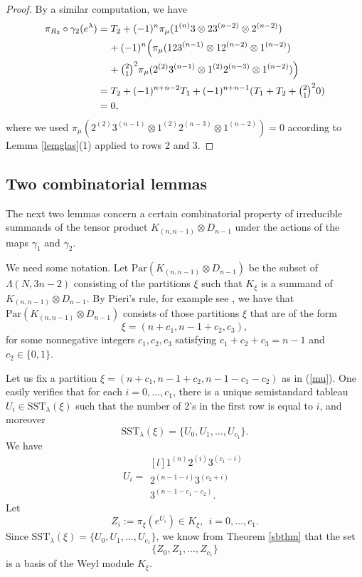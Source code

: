 \documentclass[11pt]{amsart}
\theoremstyle{definition}
\numberwithin{equation}{section}
\begin{document}
\begin{proof}
	By a similar computation, we have
	\begin{align*}\pi_{R_2} \circ \gamma_2 (e^{\lambda}) &= T_2 +(-1)^n \pi_\mu(1^{(n)}3 \otimes 23^{(n-2)} \otimes 2^{(n-2)}) \\& \;\;\;\; +(-1)^n \Big(\pi_\mu(123^{(n-1)} \otimes 12^{(n-2)} \otimes 1^{(n-2)})  \\& \;\;\;\; +\tbinom{2}{1}^2 \pi_\mu(2^{(2)}3^{(n-1)} \otimes 1^{(2)}2^{(n-3)} \otimes 1^{(n-2)})\Big) \\&= T_2+(-1)^{n+n-2}T_1+(-1)^{n+n-1}(T_1+T_2 +\tbinom{2}{1}^20) \\&=0,
	\end{align*}
	where we used $\pi_\mu(2^{(2)}3^{(n-1)} \otimes 1^{(2)}2^{(n-3)} \otimes 1^{(n-2)})=0$ according to  Lemma \ref{lemglas}(1) applied to rows 2 and 3.
\end{proof}
\subsection*{Two combinatorial lemmas}
The next two lemmas concern a certain combinatorial property of irreducible summands of the tensor product $K_{(n,n-1)} \otimes  D_{n-1}$ under the actions of the maps $\gamma_1$ and $\gamma_2$. 

We need some notation. Let $\mathrm{Par}(K_{(n,n-1)} \otimes  D_{n-1})$ be the subset of $\Lambda(N, 3n-2)$ consisting of the partitions $\xi$ such that $K_\xi$ is a summand of $K_{(n,n-1)} \otimes  D_{n-1}$. By Pieri's rule, for example see \cite[Corollary 2.3.5]{W}, we have that $\mathrm{Par}(K_{(n,n-1)} \otimes  D_{n-1})$ consists of those partitions $\xi$ that are of the form \begin{equation}\label{mu}\xi=(n + c_1, n-1 + c_2, c_3),\end{equation}
for some nonnegative integers $c_1, c_2, c_3$ satisfying $c_1 +c_2 +c_3 = n-1$ and $c_2 \in \{0,1\}$.

Let us fix a partition $\xi=(n + c_1, n-1 + c_2, n-1-c_1-c_2)$ as in (\ref{mu}). One easily verifies that for each $i=0, \dots, c_1$, there is a unique semistandard tableau $U_i \in \mathrm{SST}_{\lambda}(\xi)$ such that the number of  2's in the first row is equal to $i$, and moreover \[\mathrm{SST}_\lambda(\xi) = \{U_0, U_1, \dots, U_{c_1} \}.\] We have 
\begin{equation}\label{Si} U_i=\begin{matrix*}[l]
		1^{(n)}2^{(i)}3^{(c_1-i)} \\
		2^{(n-1-i)}3^{(c_2+i)} \\
		3^{(n-1-c_1-c_2)}. \end{matrix*}\end{equation} 
Let \[Z_i :=\pi_\xi(e^{U_i}) \in K_\xi, \ \ i=0, \dots, c_1.\]  Since $\mathrm{SST}_\lambda(\xi) = \{U_0, U_1, \dots, U_{c_1} \}$, we know from Theorem \ref{sbthm} that the set \[\{Z_0, Z_1, \dots, Z_{c_1}\}\] is a basis of the Weyl module $K_\xi.$
\end{document}
